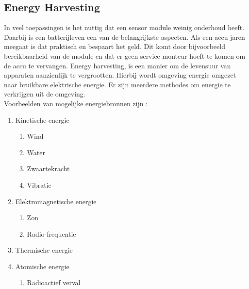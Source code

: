 \subsection{Energy Harvesting}
In veel toepassingen is het nuttig dat een sensor module weinig onderhoud heeft. Daarbij is een batterijleven een van de belangrijkste aspecten. Als een accu jaren meegaat is dat praktisch en bespaart het geld. Dit komt door bijvoorbeeld bereikbaarheid van de module en dat er geen service monteur hoeft te komen om de accu te vervangen. Energy harvesting, is een manier om de levensuur van apparaten aanzienlijk te vergrootten. Hierbij wordt omgeving energie omgezet naar bruikbare elektrische energie. Er zijn meerdere methodes om energie te verkrijgen uit de omgeving. \\Voorbeelden van mogelijke energiebronnen zijn \cite{energyHarvesting}:
\begin{enumerate}
    \item Kinetische energie
    \begin{enumerate}
        \item Wind
        \item Water
        \item Zwaartekracht
        \item Vibratie
    \end{enumerate}
    \item Elektromagnetische energie
    \begin{enumerate}
        \item Zon
        \item Radio-frequentie
    \end{enumerate}
    \item Thermische energie
    \item Atomische energie
    \begin{enumerate}
        \item Radioactief verval
    \end{enumerate}
\end{enumerate} 
